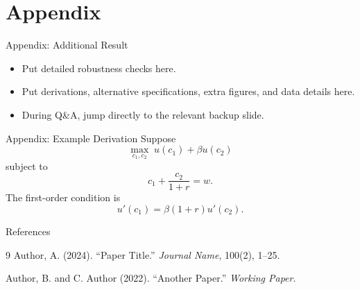 \documentclass[10pt]{beamer}
\begin{document}
\appendix
\section{Appendix}

\begin{frame}{Appendix: Additional Result}
\begin{itemize}
  \item Put detailed robustness checks here.
  \item Put derivations, alternative specifications, extra figures, and data details here.
  \item During Q\&A, jump directly to the relevant backup slide.
\end{itemize}
\end{frame}

\begin{frame}{Appendix: Example Derivation}
Suppose
\[
  \max_{c_1,c_2}\; u(c_1)+\beta u(c_2)
\]
subject to
\[
  c_1 + \frac{c_2}{1+r}=w.
\]
The first-order condition is
\[
  u'(c_1)=\beta(1+r)u'(c_2).
\]
\end{frame}

\begin{frame}{References}
\footnotesize
\begin{thebibliography}{9}
Author, A. (2024). ``Paper Title.'' \textit{Journal Name}, 100(2), 1--25.

Author, B. and C. Author (2022). ``Another Paper.'' \textit{Working Paper}.
\end{thebibliography}
\end{frame}

\end{document}

